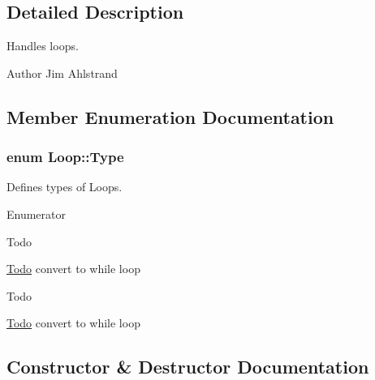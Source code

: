\subsection{Detailed Description}
Handles loops. 

\begin{DoxyAuthor}{Author}
Jim Ahlstrand 
\end{DoxyAuthor}


\subsection{Member Enumeration Documentation}
\hypertarget{classLoop_af57e9c094063c514758dfe7bd986d6e7}{}
\subsubsection[{Type}]{\setlength{\rightskip}{0pt plus 5cm}enum {\bf Loop\+::\+Type}}\label{classLoop_af57e9c094063c514758dfe7bd986d6e7}


Defines types of Loops. 

\begin{Desc}
\item[Enumerator]\par
\begin{description}
\item[{\em 
\hypertarget{classLoop_af57e9c094063c514758dfe7bd986d6e7a681be1f5a1ab60d13010c6df3358088e}{}While\label{classLoop_af57e9c094063c514758dfe7bd986d6e7a681be1f5a1ab60d13010c6df3358088e}
}]\begin{DoxyRefDesc}{Todo}
\item[\hyperlink{todo__todo000002}{Todo}]convert to while loop \end{DoxyRefDesc}
\item[{\em 
\hypertarget{classLoop_af57e9c094063c514758dfe7bd986d6e7a1dd9cd3dd842ae131b6f73ed04063cdd}{}Do\label{classLoop_af57e9c094063c514758dfe7bd986d6e7a1dd9cd3dd842ae131b6f73ed04063cdd}
}]\begin{DoxyRefDesc}{Todo}
\item[\hyperlink{todo__todo000003}{Todo}]convert to while loop \end{DoxyRefDesc}
\end{description}
\end{Desc}


\subsection{Constructor \& Destructor Documentation}
\hypertarget{classLoop_a3e42ab398babe1ba79e9242d64147960}{}
